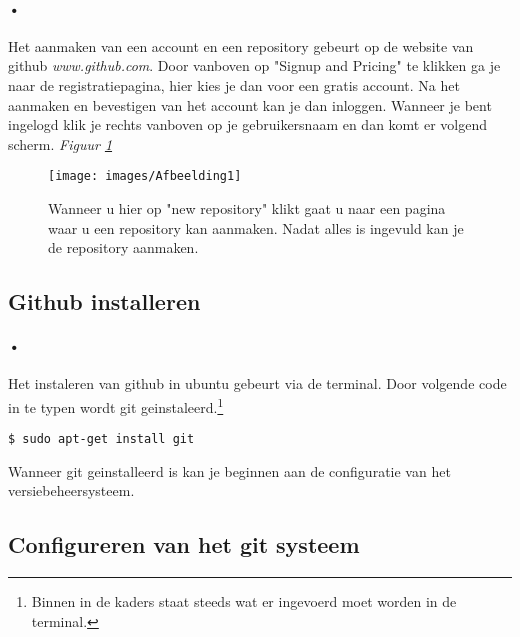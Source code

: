 \documentclass[12pt,a4paper]{report}
\begin{document}
\paragraph{•}
Het aanmaken van een account en een repository gebeurt op de website van github \emph{www.github.com}. Door vanboven op "Signup and Pricing" te klikken ga je naar de registratiepagina, hier kies je dan voor een gratis account. Na het aanmaken en bevestigen van het account kan je dan inloggen. Wanneer je bent ingelogd klik je rechts vanboven op je gebruikersnaam en dan komt er volgend scherm. \emph{Figuur \ref{afbeelding1}}
\begin{figure} [h]
\texttt{[image: images/Afbeelding1]}
\caption[Aanmaken repository]{Wanneer u hier op "new repository" klikt gaat u naar een pagina waar u een repository kan aanmaken. Nadat alles is ingevuld kan je de repository aanmaken.}
\label{afbeelding1}
\end{figure}

\subsection{Github installeren}
\paragraph{•}
Het instaleren van github in ubuntu gebeurt via de terminal. Door volgende code in te typen wordt git geinstaleerd.\footnote{Binnen in de kaders staat steeds wat er ingevoerd moet worden in de terminal.}
\begin{lstlisting}[frame=BTrl]
$ sudo apt-get install git
\end{lstlisting}
Wanneer git geinstalleerd is kan je beginnen aan de configuratie van het versiebeheersysteem.

\subsection{Configureren van het git systeem}
\end{document}
